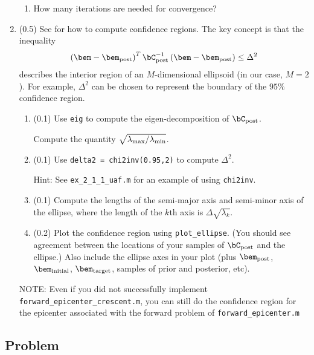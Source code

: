 \documentclass[11pt,titlepage,fleqn]{article}
\begin{document}
\begin{enumerate}
\begin{enumerate}
\item How many iterations are needed for convergence?
\end{enumerate}


\item (0.5) See \citet[][p.~34--36]{AsterE2} for how to compute confidence regions. The key concept is that the inequality
%
\begin{equation*}
\left(\bem - \bem_{\rm post} \right)^T \bC_{\rm post}^{-1} \left(\bem - \bem_{\rm post} \right) \le \Delta^2
\end{equation*}
%
describes the interior region of an $M$-dimensional ellipsoid (in our case, $M=2$). For example, $\Delta^2$ can be chosen to represent the boundary of the $95\%$ confidence region.
%
\begin{enumerate}
\item (0.1) Use \verb+eig+ to compute the eigen-decomposition of $\bC_{\rm post}$.

Compute the quantity $\sqrt{\lambda_{\rm max}/\lambda_{\rm min}}$.

\item (0.1) Use \verb+delta2 = chi2inv(0.95,2)+ to compute $\Delta^2$.

Hint: See \verb+ex_2_1_1_uaf.m+ for an example of using \verb+chi2inv+.

\item (0.1) Compute the lengths of the semi-major axis and semi-minor axis of the ellipse, where the length of the $k$th axis is $\Delta\sqrt{\lambda_k}$.

\item (0.2) Plot the confidence region using \verb+plot_ellipse+. (You should see agreement between the locations of your samples of $\bC_{\rm post}$ and the ellipse.) Also include the ellipse axes in your plot (plus $\bem_{\rm post}$, $\bem_{\rm initial}$, $\bem_{\rm target}$, samples of prior and posterior, etc).
\end{enumerate}

NOTE: Even if you did not successfully implement \verb+forward_epicenter_crescent.m+, you can still do the confidence region for the epicenter associated with the forward problem of \verb+forward_epicenter.m+

\end{enumerate}



\subsection*{Problem} \howmuchtime\
\end{document}
